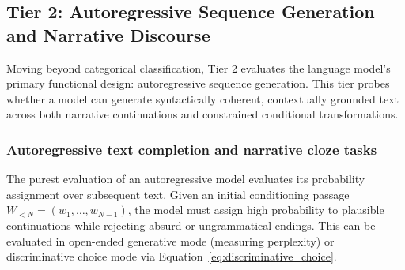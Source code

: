 \documentclass[../../main.tex]{subfiles}
\begin{document}
\subsection{Tier 2: Autoregressive Sequence Generation and Narrative Discourse}
\label{subsec:tier2_generation_discourse}

Moving beyond categorical classification, Tier 2 evaluates the language model's primary functional design: autoregressive sequence generation. This tier probes whether a model can generate syntactically coherent, contextually grounded text across both narrative continuations and constrained conditional transformations.

\subsubsection{Autoregressive text completion and narrative cloze tasks}
\label{subsec:text_completion_cloze}
The purest evaluation of an autoregressive model evaluates its probability assignment over subsequent text. Given an initial conditioning passage $W_{<N} = (w_1, \dots, w_{N-1})$, the model must assign high probability to plausible continuations while rejecting absurd or ungrammatical endings. This can be evaluated in open-ended generative mode (measuring perplexity) or discriminative choice mode via Equation~\eqref{eq:discriminative_choice}.
\end{document}
